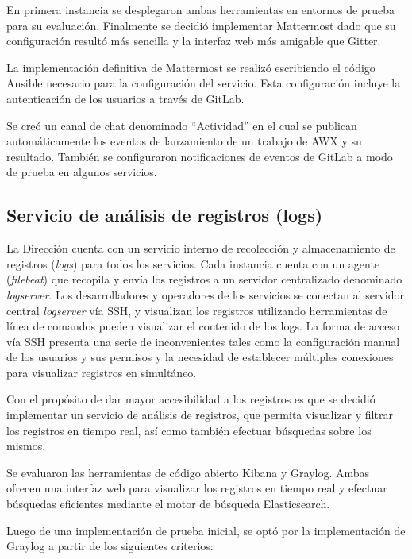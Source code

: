 En primera instancia se desplegaron ambas herramientas en entornos de prueba para su evaluación. Finalmente se decidió implementar Mattermost dado que su configuración resultó más sencilla y la interfaz web más amigable que Gitter.

La implementación definitiva de Mattermost se realizó escribiendo el código Ansible necesario para la configuración del servicio. Esta configuración incluye la autenticación de los usuarios a través de GitLab.

Se creó un canal de chat denominado “Actividad” en el cual se publican automáticamente los eventos de lanzamiento de un trabajo de AWX y su resultado. También se configuraron notificaciones de eventos de GitLab a modo de prueba en algunos servicios.

\subsection{Servicio de análisis de registros (logs)}

La Dirección cuenta con un servicio interno de recolección y almacenamiento de registros (\textit{logs}) para todos los servicios. Cada instancia cuenta con un agente (\textit{filebeat}) que recopila y envía los registros a un servidor centralizado denominado \textit{logserver}. Los desarrolladores y operadores de los servicios se conectan al servidor central \textit{logserver} vía SSH, y visualizan los registros utilizando herramientas de línea de comandos pueden visualizar el contenido de los logs. La forma de acceso vía SSH presenta una serie de inconvenientes tales como la configuración manual de los usuarios y sus permisos y la necesidad de establecer múltiples conexiones para visualizar registros en simultáneo.

Con el propósito de dar mayor accesibilidad a los registros es que se decidió implementar un servicio de análisis de registros, que permita visualizar y filtrar los registros en tiempo real, así como también efectuar búsquedas sobre los mismos. 

Se evaluaron las herramientas de código abierto Kibana y Graylog. Ambas ofrecen una interfaz web para visualizar los registros en tiempo real y efectuar búsquedas eficientes mediante el motor de búsqueda Elasticsearch.

Luego de una implementación de prueba inicial, se optó por la implementación de Graylog a partir de los siguientes criterios:

